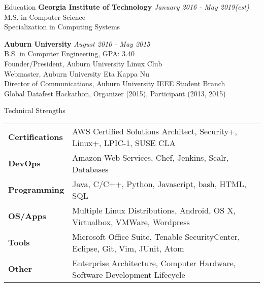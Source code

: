 \documentclass{resume} %
\begin{document}

\begin{rSection}{Education}
{\bf Georgia Institute of Technology} \hfill {\em January 2016 - May 2019(est)} \\
M.S. in Computer Science \\
Specialization in Computing Systems
\smallskip

{\bf Auburn University} \hfill {\em August 2010 - May 2015} \\
B.S. in Computer Engineering, GPA: 3.40 \\
Founder/President, Auburn University Linux Club \\
Webmaster, Auburn University Eta Kappa Nu \\
Director of Communications, Auburn University IEEE Student Branch \\
Global Datafest Hackathon, Organizer (2015), Participant (2013, 2015) \\

\end{rSection}


\begin{rSection}{Technical Strengths}

\begin{tabular}{ @{} >{\bfseries}l @{\hspace{6ex}} l }
Certifications & AWS Certified Solutions Architect, Security+, Linux+, LPIC-1, SUSE CLA \\
DevOps & Amazon Web Services, Chef, Jenkins, Scalr, Databases \\
Programming & Java, C/C++, Python, Javascript, bash, HTML, SQL \\
OS/Apps & Multiple Linux Distributions, Android, OS X, Virtualbox, VMWare, Wordpress \\
Tools & Microsoft Office Suite, Tenable SecurityCenter, Eclipse, Git, Vim, JUnit, Atom \\
Other & Enterprise Architecture, Computer Hardware, Software Development Lifecycle \\
\end{tabular}

\end{rSection}





\end{document}

